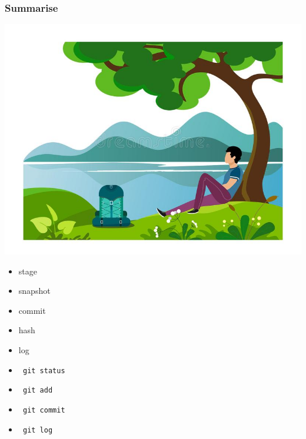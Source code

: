 \documentclass[aspectratio=169]{beamer}
\begin{document}
\begin{frame}
\frametitle<presentation>{Summarise}
  
\noindent\begin{minipage}{0.6\textwidth}%
\includegraphics[width=\linewidth]{pictures/resting-under-tree.jpg}
\end{minipage}%
\hfill%
\begin{minipage}{0.4\textwidth}\raggedleft
\begin{itemize}
    \item stage
    \item snapshot
	\item commit
	\item hash
	\item  log
	\end{itemize}
	\pause
	\begin{itemize}
    \item  \texttt{ git status}
    \item  \texttt{ git add}
    \item  \texttt{ git commit} 
    \item  \texttt{ git log}
	\end{itemize}
	
\end{minipage}
  
\end{frame}
\end{document}
